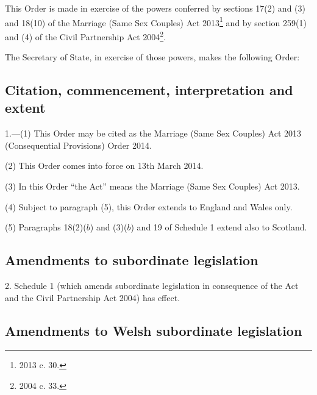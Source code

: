 \documentclass[12pt,a4paper]{article}
\title{\regstitle}
\author{S.I.\ 2014 No.\ 107}
\date{Made
20th January 2014\\
Laid before Parliament
23rd January 2014\\
Coming into force
13th March 2014
}
\begin{document}
\maketitle

\enlargethispage{\baselineskip}

\noindent
This Order is made in exercise of the powers conferred by sections 17(2) and (3) and 18(10) of the Marriage (Same Sex Couples) Act 2013\footnote{2013 c. 30.} and by section 259(1) and (4) of the Civil Partnership Act 2004\footnote{2004 c. 33.}.

The Secretary of State, in exercise of those powers, makes the following Order: 

{\sloppy

\tableofcontents

}

\bigskip

\setcounter{secnumdepth}{-2}

\subsection[1. Citation, commencement, interpretation and extent]{Citation, commencement, interpretation and extent}

1.—(1) This Order may be cited as the Marriage (Same Sex Couples) Act 2013 (Consequential Provisions) Order 2014.

(2) This Order comes into force on 13th March 2014.

(3) In this Order “the Act” means the Marriage (Same Sex Couples) Act 2013.

(4) Subject to paragraph (5), this Order extends to England and Wales only.

(5) Paragraphs 18(2)($b$)  and (3)($b$)  and 19 of Schedule 1 extend also to Scotland.

\subsection[2. Amendments to subordinate legislation]{Amendments to subordinate legislation}

2.  Schedule 1 (which amends subordinate legislation in consequence of the Act and the Civil Partnership Act 2004) has effect.

\subsection[3. Amendments to Welsh subordinate legislation]{Amendments to Welsh subordinate legislation}
\end{document}
